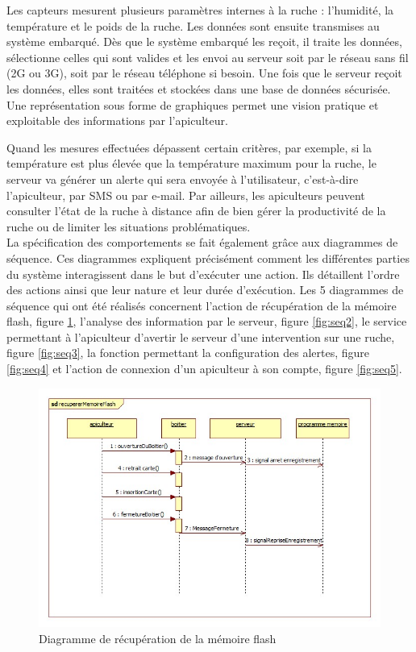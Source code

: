 Les capteurs mesurent plusieurs paramètres internes à la ruche : l'humidité, la température et le poids de la ruche. Les données sont ensuite transmises au système embarqué. Dès que le système embarqué les reçoit, il traite les données, sélectionne celles qui sont valides et les envoi au serveur soit par le réseau sans fil (2G ou 3G), soit par le réseau téléphone si besoin. Une fois que le serveur reçoit les données, elles sont traitées et stockées dans une base de données sécurisée. Une représentation sous forme de graphiques permet une vision pratique et exploitable des informations par l'apiculteur.

Quand les mesures effectuées dépassent certain critères, par exemple, si la température est plus élevée que la température maximum pour la ruche, le serveur va générer un alerte qui sera envoyée à l'utilisateur, c'est-à-dire l'apiculteur, par SMS ou par e-mail. Par ailleurs, les apiculteurs peuvent consulter l’état de la ruche à distance afin de bien gérer la productivité de la ruche ou de limiter les situations problématiques. \\


La spécification des comportements se fait également grâce aux diagrammes de séquence. Ces diagrammes expliquent précisément comment les différentes parties du système interagissent dans le but d'exécuter une action. Ils détaillent l'ordre des actions ainsi que leur nature et leur durée d'exécution. Les 5 diagrammes de séquence qui ont été réalisés concernent l'action de récupération de la mémoire flash, figure \ref{fig:seq1}, l'analyse des information par le serveur, figure \ref{fig:seq2}, le service permettant à l'apiculteur d'avertir le serveur d'une intervention sur une ruche, figure \ref{fig:seq3}, la fonction permettant la configuration des alertes, figure \ref{fig:seq4} et l'action de connexion d'un apiculteur à son compte, figure \ref{fig:seq5}.
\begin{figure}[h!]
\centering\includegraphics[scale=0.7]{recupererMemoireFlash.jpg}
\caption{\label{fig:seq1} Diagramme de récupération de la mémoire flash}
\end{figure}\\

